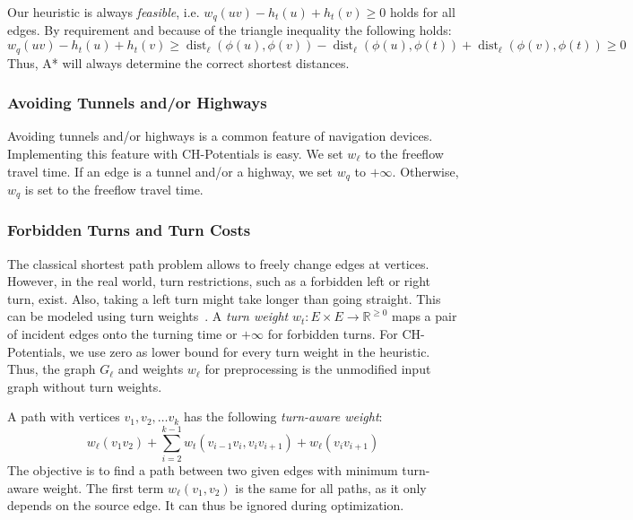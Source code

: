 \documentclass[manuscript,review]{acmart}
\newcommand*{\dist}{\operatorname{dist}}
\begin{document}
Our heuristic is always \emph{feasible}, i.e. $w_q(u v) - h_t(u) + h_t(v) \geq 0$ holds for all edges.
By requirement and because of the triangle inequality the following holds:
\[
w_q(u v) - h_t(u) + h_t(v) \geq \dist_\ell(\phi(u), \phi(v)) - \dist_\ell(\phi(u), \phi(t)) + \dist_\ell(\phi(v), \phi(t)) \geq 0
\]
Thus, A* will always determine the correct shortest distances.

\subsubsection{Avoiding Tunnels and/or Highways}
\label{sec:no-tunnel-highway}

Avoiding tunnels and/or highways is a common feature of navigation devices.
Implementing this feature with CH-Potentials is easy.
We set $w_\ell$ to the freeflow travel time.
If an edge is a tunnel and/or a highway, we set $w_q$ to $+\infty$.
Otherwise, $w_q$ is set to the freeflow travel time.

\subsubsection{Forbidden Turns and Turn Costs}
\label{sec:no-turns}

The classical shortest path problem allows to freely change edges at vertices.
However, in the real world, turn restrictions, such as a forbidden left or right turn, exist.
Also, taking a left turn might take longer than going straight.
This can be modeled using turn weights~\cite{gv-errnt-11,dgpw-crprn-13,bwzz-cchtc-20}.
A \emph{turn weight} $w_t : E \times E \to \mathbb{R}^{\geq 0}$ maps a pair of incident edges onto the turning time or $+\infty$ for forbidden turns. %
For CH-Potentials, we use zero as lower bound for every turn weight in the heuristic.
Thus, the graph $G_\ell$ and weights $w_\ell$ for preprocessing is the unmodified input graph without turn weights.

A path with vertices $v_1, v_2,\ldots v_k$ has the following \emph{turn-aware weight}: \[
w_\ell(v_1 v_2) + \sum_{i=2}^{k-1}  w_t(v_{i-1} v_i, v_i v_{i+1}) + w_\ell(v_i v_{i+1})
\]
The objective is to find a path between two given edges with minimum turn-aware weight.
The first term $w_\ell(v_1, v_2)$ is the same for all paths, as it only depends on the source edge.
It can thus be ignored during optimization.
\end{document}
